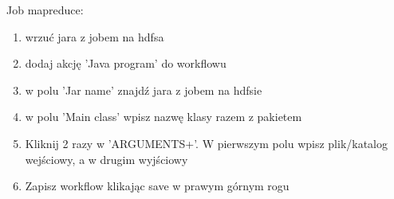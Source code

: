 \documentclass[11pt]{article}
\begin{document}
\pagebreak

Job mapreduce:
\begin{enumerate}
\item wrzuć jara z jobem na hdfsa
\item dodaj akcję 'Java program' do workflowu
\item w polu 'Jar name' znajdź jara z jobem na hdfsie
\item w polu 'Main class' wpisz nazwę klasy razem z pakietem
\item Kliknij 2 razy w 'ARGUMENTS+'. W pierwszym polu wpisz plik/katalog wejściowy, a w drugim wyjściowy
\item Zapisz workflow klikając save w prawym górnym rogu
\end{enumerate}
\end{document}
